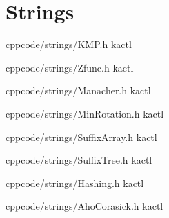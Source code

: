 \chapter{Strings}

{}{}
{cpp}{code/strings/KMP.h}
{kactl}

{}{}
{cpp}{code/strings/Zfunc.h}
{kactl}

{}{}
{cpp}{code/strings/Manacher.h}
{kactl}

{}{}
{cpp}{code/strings/MinRotation.h}
{kactl}

{}{}
{cpp}{code/strings/SuffixArray.h}
{kactl}

{}{}
{cpp}{code/strings/SuffixTree.h}
{kactl}

{}{}
{cpp}{code/strings/Hashing.h}
{kactl}

{}{}
{cpp}{code/strings/AhoCorasick.h}
{kactl}
